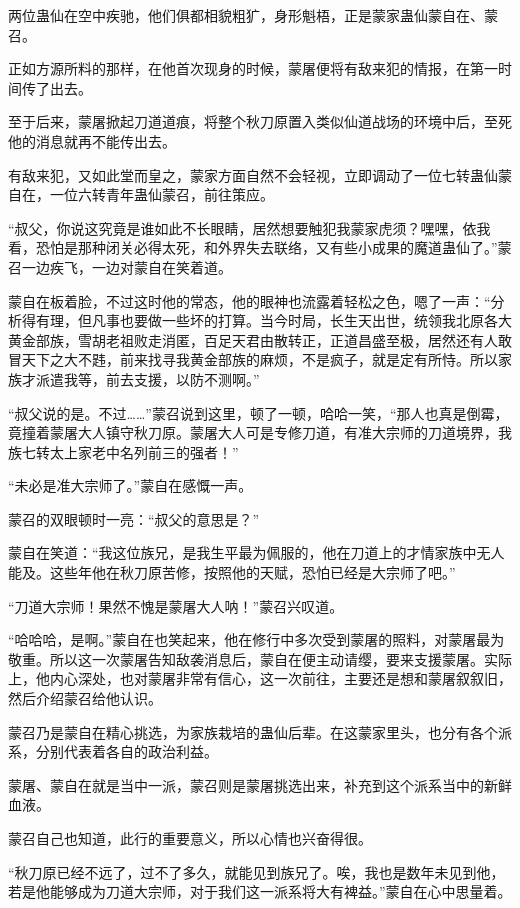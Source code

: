
\begin{this_body}

两位蛊仙在空中疾驰，他们俱都相貌粗犷，身形魁梧，正是蒙家蛊仙蒙自在、蒙召。

正如方源所料的那样，在他首次现身的时候，蒙屠便将有敌来犯的情报，在第一时间传了出去。

至于后来，蒙屠掀起刀道道痕，将整个秋刀原置入类似仙道战场的环境中后，至死他的消息就再不能传出去。

有敌来犯，又如此堂而皇之，蒙家方面自然不会轻视，立即调动了一位七转蛊仙蒙自在，一位六转青年蛊仙蒙召，前往策应。

“叔父，你说这究竟是谁如此不长眼睛，居然想要触犯我蒙家虎须？嘿嘿，依我看，恐怕是那种闭关必得太死，和外界失去联络，又有些小成果的魔道蛊仙了。”蒙召一边疾飞，一边对蒙自在笑着道。

蒙自在板着脸，不过这时他的常态，他的眼神也流露着轻松之色，嗯了一声：“分析得有理，但凡事也要做一些坏的打算。当今时局，长生天出世，统领我北原各大黄金部族，雪胡老祖败走消匿，百足天君由散转正，正道昌盛至极，居然还有人敢冒天下之大不韪，前来找寻我黄金部族的麻烦，不是疯子，就是定有所恃。所以家族才派遣我等，前去支援，以防不测啊。”

“叔父说的是。不过……”蒙召说到这里，顿了一顿，哈哈一笑，“那人也真是倒霉，竟撞着蒙屠大人镇守秋刀原。蒙屠大人可是专修刀道，有准大宗师的刀道境界，我族七转太上家老中名列前三的强者！”

“未必是准大宗师了。”蒙自在感慨一声。

蒙召的双眼顿时一亮：“叔父的意思是？”

蒙自在笑道：“我这位族兄，是我生平最为佩服的，他在刀道上的才情家族中无人能及。这些年他在秋刀原苦修，按照他的天赋，恐怕已经是大宗师了吧。”

“刀道大宗师！果然不愧是蒙屠大人呐！”蒙召兴叹道。

“哈哈哈，是啊。”蒙自在也笑起来，他在修行中多次受到蒙屠的照料，对蒙屠最为敬重。所以这一次蒙屠告知敌袭消息后，蒙自在便主动请缨，要来支援蒙屠。实际上，他内心深处，也对蒙屠非常有信心，这一次前往，主要还是想和蒙屠叙叙旧，然后介绍蒙召给他认识。

蒙召乃是蒙自在精心挑选，为家族栽培的蛊仙后辈。在这蒙家里头，也分有各个派系，分别代表着各自的政治利益。

蒙屠、蒙自在就是当中一派，蒙召则是蒙屠挑选出来，补充到这个派系当中的新鲜血液。

蒙召自己也知道，此行的重要意义，所以心情也兴奋得很。

“秋刀原已经不远了，过不了多久，就能见到族兄了。唉，我也是数年未见到他，若是他能够成为刀道大宗师，对于我们这一派系将大有裨益。”蒙自在心中思量着。


\end{this_body}
